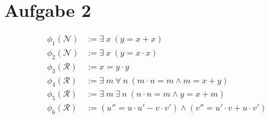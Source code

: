 \documentclass[a4paper,10pt]{article}
\begin{document}
\section*{Aufgabe 2}
\begin{align*}
\phi_1(\mathcal{N}) &:= \exists~ x~ (y = x + x) \\
\phi_2(\mathcal{N}) &:= \exists~ x~ (y = x \cdot x) \\
\phi_3(\mathcal{R}) &:= x = y \cdot y \\
\phi_4(\mathcal{R}) &:= \exists~ m~ \forall~ n~ (m \cdot n = m \wedge m = x + y) \\
\phi_5(\mathcal{R}) &:= \exists~ m~ \exists~ n~ (n \cdot n = m \wedge y = x + m) \\
\phi_6(\mathcal{R}) &:= (u'' = u \cdot u' - v \cdot v') \wedge (v'' = u' \cdot v + u \cdot v') \\
\end{align*}
\end{document}
